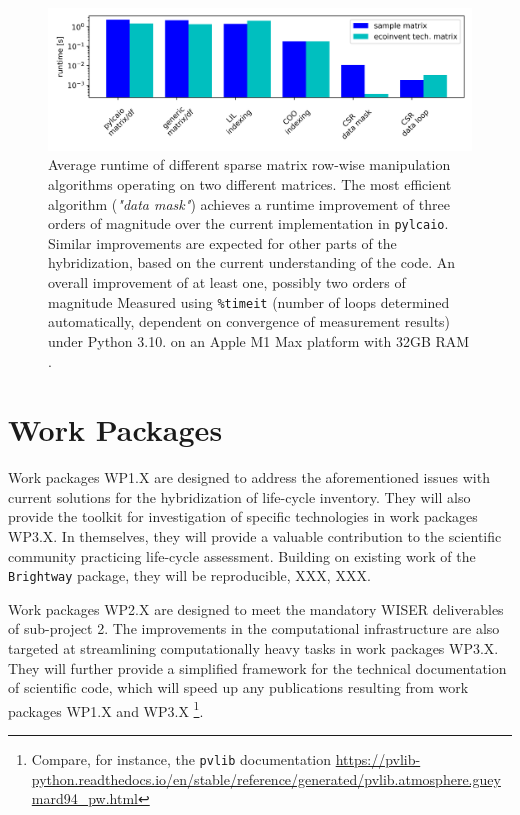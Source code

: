 \documentclass{article}
\begin{document}
\begin{figure}[h!]
	\centering
	\includegraphics[width=\textwidth]{figures/performance.png}
	\caption{Average runtime of different sparse matrix row-wise manipulation algorithms operating on two different matrices. The most efficient algorithm (\textit{"data mask"}) achieves a runtime improvement of three orders of magnitude over the current implementation in \texttt{pylcaio}. Similar improvements are expected for other parts of the hybridization, based on the current understanding of the code. An overall improvement of at least one, possibly two orders of magnitude Measured using \texttt{\%timeit} (number of loops determined automatically, dependent on convergence of measurement results) under Python 3.10. on an Apple M1 Max platform with 32GB RAM \cite{weinold_github_2022}.}
	\label{fig:performance}
\end{figure}

\newpage
\section{Work Packages}

    Work packages WP1.X are designed to address the aforementioned issues with current solutions for the hybridization of life-cycle inventory. They will also provide the toolkit for investigation of specific technologies in work packages WP3.X. In themselves, they will provide a valuable contribution to the scientific community practicing life-cycle assessment. Building on existing work of the \texttt{Brightway} package, they will be reproducible, XXX, XXX.
    
    Work packages WP2.X are designed to meet the mandatory WISER deliverables of sub-project 2. The improvements in the computational infrastructure are also targeted at streamlining computationally heavy tasks in work packages WP3.X. They will further provide a simplified framework for the technical documentation of scientific code, which will speed up any publications resulting from work packages WP1.X and WP3.X \footnote{Compare, for instance, the \texttt{pvlib} documentation \url{https://pvlib-python.readthedocs.io/en/stable/reference/generated/pvlib.atmosphere.gueymard94_pw.html}}.
    
\end{document}
